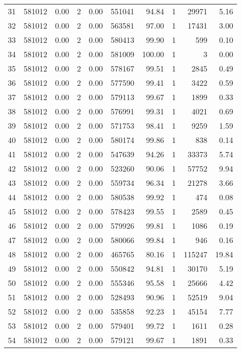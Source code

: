 \documentclass[11pt]{article}
\begin{document}
\begin{enumerate}
\begin{table}[ht]
{\begin{tabular}{|l|r|r|r|l|r|r|l|r|r|}
		31 & 581012 & 0.00 & 2 & 0.00 & 551041 & 94.84 & 1 & 29971 & 5.16 \\
		32 & 581012 & 0.00 & 2 & 0.00 & 563581 & 97.00 & 1 & 17431 & 3.00 \\
		33 & 581012 & 0.00 & 2 & 0.00 & 580413 & 99.90 & 1 & 599 & 0.10 \\
		34 & 581012 & 0.00 & 2 & 0.00 & 581009 & 100.00 & 1 & 3 & 0.00 \\
		35 & 581012 & 0.00 & 2 & 0.00 & 578167 & 99.51 & 1 & 2845 & 0.49 \\
		36 & 581012 & 0.00 & 2 & 0.00 & 577590 & 99.41 & 1 & 3422 & 0.59 \\
		37 & 581012 & 0.00 & 2 & 0.00 & 579113 & 99.67 & 1 & 1899 & 0.33 \\
		38 & 581012 & 0.00 & 2 & 0.00 & 576991 & 99.31 & 1 & 4021 & 0.69 \\
		39 & 581012 & 0.00 & 2 & 0.00 & 571753 & 98.41 & 1 & 9259 & 1.59 \\
		40 & 581012 & 0.00 & 2 & 0.00 & 580174 & 99.86 & 1 & 838 & 0.14 \\
		41 & 581012 & 0.00 & 2 & 0.00 & 547639 & 94.26 & 1 & 33373 & 5.74 \\
		42 & 581012 & 0.00 & 2 & 0.00 & 523260 & 90.06 & 1 & 57752 & 9.94 \\
		43 & 581012 & 0.00 & 2 & 0.00 & 559734 & 96.34 & 1 & 21278 & 3.66 \\
		44 & 581012 & 0.00 & 2 & 0.00 & 580538 & 99.92 & 1 & 474 & 0.08 \\
		45 & 581012 & 0.00 & 2 & 0.00 & 578423 & 99.55 & 1 & 2589 & 0.45 \\
		46 & 581012 & 0.00 & 2 & 0.00 & 579926 & 99.81 & 1 & 1086 & 0.19 \\
		47 & 581012 & 0.00 & 2 & 0.00 & 580066 & 99.84 & 1 & 946 & 0.16 \\
		48 & 581012 & 0.00 & 2 & 0.00 & 465765 & 80.16 & 1 & 115247 & 19.84 \\
		49 & 581012 & 0.00 & 2 & 0.00 & 550842 & 94.81 & 1 & 30170 & 5.19 \\
		50 & 581012 & 0.00 & 2 & 0.00 & 555346 & 95.58 & 1 & 25666 & 4.42 \\
		51 & 581012 & 0.00 & 2 & 0.00 & 528493 & 90.96 & 1 & 52519 & 9.04 \\
		52 & 581012 & 0.00 & 2 & 0.00 & 535858 & 92.23 & 1 & 45154 & 7.77 \\
		53 & 581012 & 0.00 & 2 & 0.00 & 579401 & 99.72 & 1 & 1611 & 0.28 \\
		54 & 581012 & 0.00 & 2 & 0.00 & 579121 & 99.67 & 1 & 1891 & 0.33 \\

\end{tabular}}
\end{table}
\end{enumerate}
\end{document}
